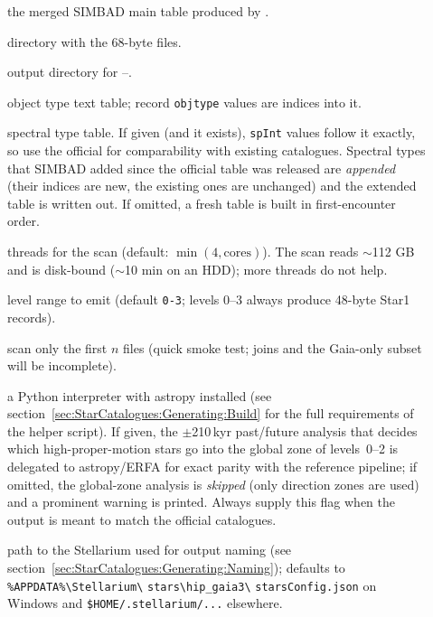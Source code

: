 \begin{description}
  \item[] the merged SIMBAD main table produced by
        \allowbreak{}.
  \item[] directory with the 68-byte  files.
  \item[] output directory for --.
  \item[] object type text table; record \texttt{objtype}
        values are indices into it.
  \item[] spectral type table. If given (and it exists),
        \texttt{spInt} values follow it exactly, so use the official
         for comparability with existing
        catalogues. Spectral types that SIMBAD added since the official
        table was released are \emph{appended} (their indices are new, the
        existing ones are unchanged) and the extended table is written out.
        If omitted, a fresh table is built in first-encounter order.
  \item[] threads for the  scan
        (default: $\min(4, \mathrm{cores})$). The scan reads $\sim$112 GB
        and is disk-bound ($\sim$10 min on an HDD); more threads do not help.
  \item[] level range to emit (default \texttt{0-3};
        levels 0--3 always produce 48-byte Star1 records).
  \item[] scan only the first $n$  files
        (quick smoke test; joins and the Gaia-only subset will be incomplete).
  \item[] a Python interpreter with astropy
        installed (see section~\ref{sec:StarCatalogues:Generating:Build}
        for the full requirements of the helper script). If given, the
        $\pm$210\,kyr past/future analysis that
        decides which high-proper-motion stars go into the global zone of
        levels~0--2 is delegated to astropy/ERFA for exact parity with the
        reference pipeline; if omitted, the global-zone analysis is
        \emph{skipped} (only direction zones are used) and a prominent
        warning is printed. Always supply this flag when the output is meant
        to match the official catalogues.
  \item[] path to the Stellarium
         used for output naming (see
        section~\ref{sec:StarCatalogues:Generating:Naming}); defaults to
        \texttt{\%APPDATA\%\textbackslash Stellarium\textbackslash}
        \texttt{stars\textbackslash hip\_gaia3\textbackslash}
        \texttt{starsConfig.json} on Windows and
        \texttt{\$HOME/.stellarium/...} elsewhere.
\end{description}


